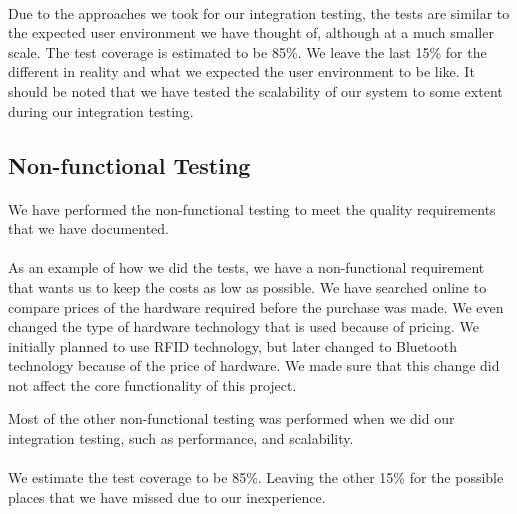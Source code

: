 \documentclass{article}
\begin{document}
\paragraph{}Due to the approaches we took for our integration testing, the tests are similar to the expected user environment we have thought of, although at a much smaller scale. The test coverage is estimated to be 85\%. We leave the last 15\% for the different in reality and what we expected the user environment to be like. It should be noted that we have tested the scalability of our system to some extent during our integration testing.

\subsection{Non-functional Testing}
\paragraph{}We have performed the non-functional testing to meet the quality requirements that we have documented. 

\paragraph{}As an example of how we did the tests, we have a non-functional requirement that wants us to keep the costs as low as possible. We have searched online to compare prices of the hardware required before the purchase was made. We even changed the type of hardware technology that is used because of pricing. We initially planned to use RFID technology, but later changed to Bluetooth technology because of the price of hardware. We made sure that this change did not affect the core functionality of this project.
\par{}Most of the other non-functional testing was performed when we did our integration testing, such as performance, and scalability.

\paragraph{}We estimate the test coverage to be 85\%. Leaving the other 15\% for the possible places that we have missed due to our inexperience.
\end{document}
